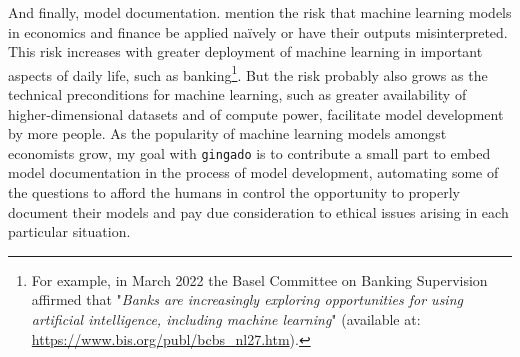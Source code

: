 \documentclass{article}
\begin{document}
And finally, model documentation. \cite{10.1257/jep.31.2.87} mention the risk that machine learning models in economics and finance be applied naïvely or have their outputs misinterpreted. This risk increases with greater deployment of machine learning in important aspects of daily life, such as banking\footnote{For example, in March 2022 the Basel Committee on Banking Supervision affirmed that "\textit{Banks are increasingly exploring opportunities for using artificial intelligence, including machine learning}" (available at: \url{https://www.bis.org/publ/bcbs_nl27.htm}).}. But the risk probably also grows as the technical preconditions for machine learning, such as greater availability of higher-dimensional datasets and of compute power, facilitate model development by more people. As the popularity of machine learning models amongst economists grow, my goal with \texttt{gingado} is to contribute a small part to embed model documentation in the process of model development, automating some of the questions to afford the humans in control the opportunity to properly document their models and pay due consideration to ethical issues arising in each particular situation.



%
%
\printbibliography
\end{document}
